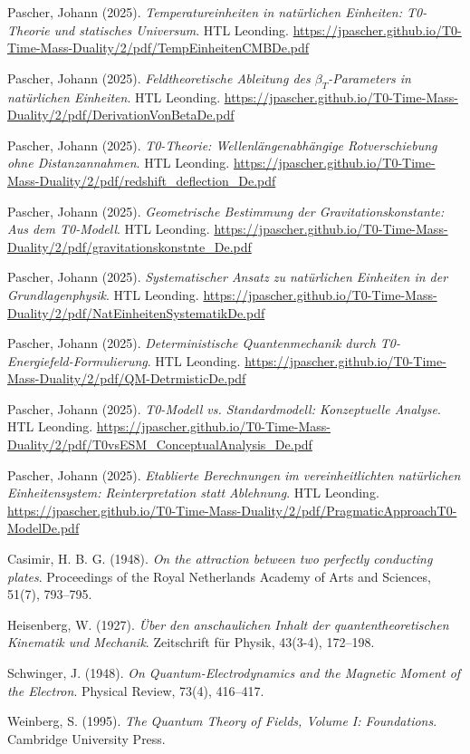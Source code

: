 \documentclass[12pt,a4paper]{article}
\theoremstyle{remark}
\begin{document}
\begin{thebibliography}{99}
	Pascher, Johann (2025). 
	\textit{Temperatureinheiten in natürlichen Einheiten: T0-Theorie und statisches Universum}. 
	HTL Leonding. 
	\url{https://jpascher.github.io/T0-Time-Mass-Duality/2/pdf/TempEinheitenCMBDe.pdf}
	
	Pascher, Johann (2025). 
	\textit{Feldtheoretische Ableitung des $\beta_T$-Parameters in natürlichen Einheiten}. 
	HTL Leonding. 
	\url{https://jpascher.github.io/T0-Time-Mass-Duality/2/pdf/DerivationVonBetaDe.pdf}
	
	Pascher, Johann (2025). 
	\textit{T0-Theorie: Wellenlängenabhängige Rotverschiebung ohne Distanzannahmen}. 
	HTL Leonding. 
	\url{https://jpascher.github.io/T0-Time-Mass-Duality/2/pdf/redshift_deflection_De.pdf}
	
	Pascher, Johann (2025). 
	\textit{Geometrische Bestimmung der Gravitationskonstante: Aus dem T0-Modell}. 
	HTL Leonding. 
	\url{https://jpascher.github.io/T0-Time-Mass-Duality/2/pdf/gravitationskonstnte_De.pdf}
	
	Pascher, Johann (2025). 
	\textit{Systematischer Ansatz zu natürlichen Einheiten in der Grundlagenphysik}. 
	HTL Leonding. 
	\url{https://jpascher.github.io/T0-Time-Mass-Duality/2/pdf/NatEinheitenSystematikDe.pdf}
	
	Pascher, Johann (2025). 
	\textit{Deterministische Quantenmechanik durch T0-Energiefeld-Formulierung}. 
	HTL Leonding. 
	\url{https://jpascher.github.io/T0-Time-Mass-Duality/2/pdf/QM-DetrmisticDe.pdf}
	
	Pascher, Johann (2025). 
	\textit{T0-Modell vs. Standardmodell: Konzeptuelle Analyse}. 
	HTL Leonding. 
	\url{https://jpascher.github.io/T0-Time-Mass-Duality/2/pdf/T0vsESM_ConceptualAnalysis_De.pdf}
	
	Pascher, Johann (2025). 
	\textit{Etablierte Berechnungen im vereinheitlichten natürlichen Einheitensystem: Reinterpretation statt Ablehnung}. 
	HTL Leonding. 
	\url{https://jpascher.github.io/T0-Time-Mass-Duality/2/pdf/PragmaticApproachT0-ModelDe.pdf}
	
	Casimir, H. B. G. (1948). 
	\textit{On the attraction between two perfectly conducting plates}. 
	Proceedings of the Royal Netherlands Academy of Arts and Sciences, 51(7), 793--795.
	
	Heisenberg, W. (1927). 
	\textit{Über den anschaulichen Inhalt der quantentheoretischen Kinematik und Mechanik}. 
	Zeitschrift für Physik, 43(3-4), 172--198.
	
	Schwinger, J. (1948). 
	\textit{On Quantum-Electrodynamics and the Magnetic Moment of the Electron}. 
	Physical Review, 73(4), 416--417.
	
	Weinberg, S. (1995). 
	\textit{The Quantum Theory of Fields, Volume I: Foundations}. 
	Cambridge University Press.
	
\end{thebibliography}
\end{document}
